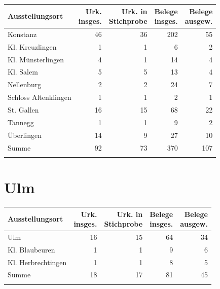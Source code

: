 \begin{tabularx}{\linewidth}{X r r r r}
\lsptoprule
Ausstellungsort
	& \makecell{Urk.\\ insges.}
	& \makecell{Urk. in\\ Stichprobe}
	& \makecell{Belege\\ insges.}
	& \makecell{Belege\\ ausgew.}
	\\
\midrule

Konstanz
	& 46
	& 36
	& 202
	& 55
	\\

Kl. Kreuzlingen
	& 1
	& 1
	& 6
	& 2
	\\

Kl. Münsterlingen
	& 4
	& 1
	& 14
	& 4
	\\

Kl. Salem
	& 5
	& 5
	& 13
	& 4
	\\

Nellenburg
	& 2
	& 2
	& 24
	& 7
	\\

Schloss Altenklingen
	& 1
	& 1
	& 2
	& 1
	\\

St. Gallen
	& 16
	& 15
	& 68
	& 22
	\\

Tannegg
	& 1
	& 1
	& 9
	& 2
	\\

Überlingen
	& 14
	& 9
	& 27
	& 10
	\\

\midrule

Summe
	& 92
	& 73
	& 370
	& 107
	\\

\lspbottomrule
\end{tabularx}


\section{Ulm}

\begin{tabularx}{\linewidth}{X r r r r}
\lsptoprule
Ausstellungsort
	& \makecell{Urk.\\ insges.}
	& \makecell{Urk. in\\ Stichprobe}
	& \makecell{Belege\\ insges.}
	& \makecell{Belege\\ ausgew.}
	\\
\midrule

Ulm
	& 16
	& 15
	& 64
	& 34
	\\

Kl. Blaubeuren
	& 1
	& 1
	& 9
	& 6
	\\

Kl. Herbrechtingen
	& 1
	& 1
	& 8
	& 5
	\\

\midrule

Summe
	& 18
	& 17
	& 81
	& 45
	\\

\lspbottomrule
\end{tabularx}

